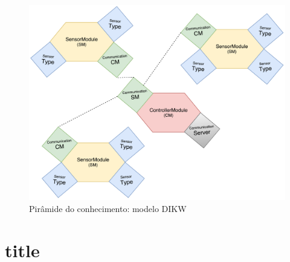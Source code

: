 \begin{figure}[!htb]
	\centering
	\includegraphics[scale=0.55]{esquemas/general-electronic-modules.pdf}
	\caption{Pirâmide do conhecimento: modelo DIKW}
	\label{dikw}
\end{figure}


\section{title}